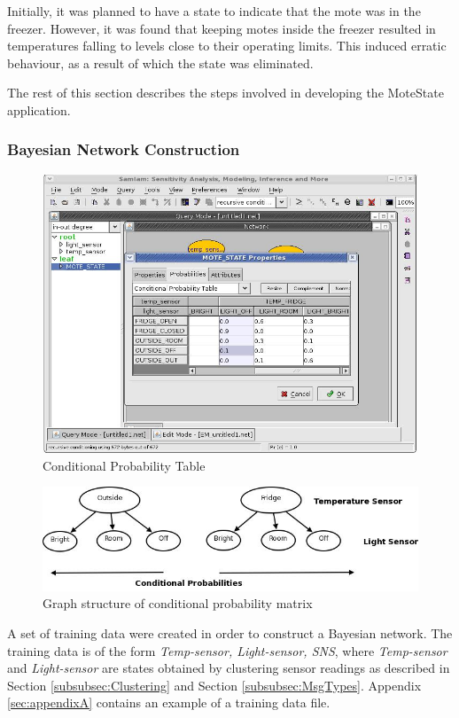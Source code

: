 \documentclass{sig-alternate-10pt}
\begin{document}
Initially, it was planned to have a state to indicate that the mote was in the
freezer. However, it was found that keeping motes inside the freezer resulted in
temperatures falling to levels close to their operating limits. This induced
erratic behaviour, as a result of which the state was eliminated.

The rest of this section describes the steps involved in developing the
MoteState application.


\subsubsection{Bayesian Network Construction}
\begin{figure}[t]
\centering
\includegraphics[scale=0.25]{img/SamIAmCondProb.png}
\caption{Conditional Probability Table} 
\label{Fig3:BayesianCondProb}
\end{figure} 
  \begin{figure}[t]
\centering
\includegraphics[scale=0.25]{img/SamIamGraph.png}
\caption{Graph structure of conditional probability matrix} 
\label{Fig4:SamIamGraph}
\end{figure}  
A set of training data were created in order to construct a Bayesian network.
The training data is of the form \emph{Temp-sensor, Light-sensor, SNS},
where \emph{Temp-sensor} and \emph{Light-sensor} are states obtained by
clustering sensor readings as described
in Section \ref{subsubsec:Clustering} and Section \ref{subsubsec:MsgTypes}. Appendix \ref{sec:appendixA} contains an example of a training data file.
\end{document}
